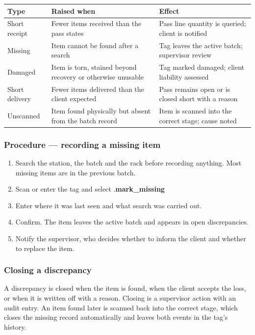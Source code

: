 \documentclass[11pt,a4paper,oneside]{book}
\begin{document}
\begin{center}\small
\begin{tabularx}{\linewidth}{|X|X|X|}
\hline
\rowcolor{lightgrey}
\textbf{Type} & \textbf{Raised when} & \textbf{Effect} \\ \hline
Short receipt & Fewer items received than the pass states & Pass line quantity is queried; client is notified \\ \hline
Missing & Item cannot be found after a search & Tag leaves the active batch; supervisor review \\ \hline
Damaged & Item is torn, stained beyond recovery or otherwise unusable & Tag marked damaged; client liability assessed \\ \hline
Short delivery & Fewer items delivered than the client expected & Pass remains open or is closed short with a reason \\ \hline
Unscanned & Item found physically but absent from the batch record & Item is scanned into the correct stage; cause noted \\ \hline
\end{tabularx}
\end{center}
\subsubsection*{Procedure — recording a missing item}
\begin{enumerate}
\item Search the station, the batch and the rack before recording anything. Most missing items are in the previous batch.
\item Scan or enter the tag and select .\textbf{mark\_missing}
\item Enter where it was last seen and what search was carried out.
\item Confirm. The item leaves the active batch and appears in open discrepancies.
\item Notify the supervisor, who decides whether to inform the client and whether to replace the item.
\end{enumerate}
\subsubsection*{Closing a discrepancy}
A discrepancy is closed when the item is found, when the client accepts the loss, or when it is written off with a reason. Closing is a supervisor action with an audit entry. An item found later is scanned back into the correct stage, which closes the missing record automatically and leaves both events in the tag's history.
\end{document}
